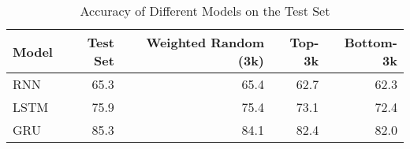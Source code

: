 \begin{table}
\centering
\caption{Accuracy of Different Models on the Test Set}
\label{model_comparison}
\begin{tabular}{lrrrr}
\toprule
Model & Test Set & Weighted Random (3k) & Top-3k & Bottom-3k \\
\midrule
RNN & 65.3 & 65.4 & 62.7 & 62.3 \\
LSTM & 75.9 & 75.4 & 73.1 & 72.4 \\
GRU & 85.3 & 84.1 & 82.4 & 82.0 \\
\bottomrule
\end{tabular}
\end{table}
